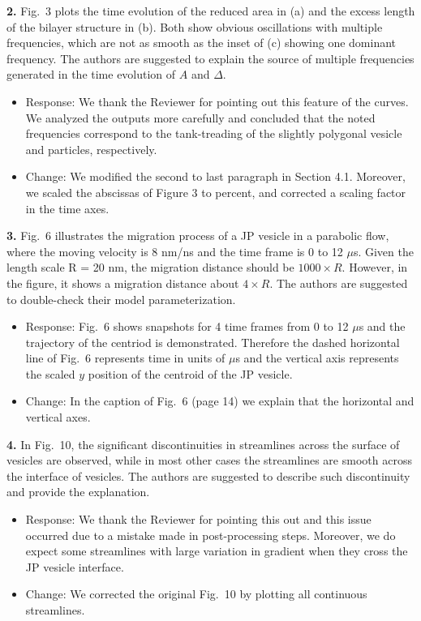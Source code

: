 \documentclass[11pt]{article}
\newcommand{\comment}[1]{{\color{blue} #1}}
\begin{document}
\noindent
\comment{{\bf 2.} Fig.~3 plots the time evolution of the reduced area in (a) and
the excess length of the bilayer structure in (b). Both show obvious
oscillations with multiple frequencies, which are not as smooth as the
inset of (c) showing one dominant frequency. The authors are suggested
to explain the source of multiple frequencies generated in the time
evolution of $A$ and $\Delta$.}
\begin{itemize}
\item Response: We thank the Reviewer for pointing out this feature of
  the curves.  We analyzed the outputs more carefully and concluded that
  the noted frequencies correspond to the tank-treading of the slightly
  polygonal vesicle and particles, respectively. 

\item Change: We modified the second to last paragraph in Section 4.1.
  Moreover, we scaled the abscissas of Figure 3 to percent, and corrected
  a scaling factor in the time axes. 

\end{itemize}

\noindent
\comment{{\bf 3.} Fig.~6 illustrates the migration process of a JP vesicle in a
parabolic flow, where the moving velocity is 8 nm/ns and the time frame
is 0 to 12 $\mu$s. Given the length scale R = 20 nm, the migration
distance should be $1000 \times R$. However, in the figure, it shows a
migration distance about $4 \times R$. The authors are suggested to
double-check their model parameterization.}
\begin{itemize}
  \item Response: Fig.~6 shows snapshots for 4 time frames from 0 to 12 $\mu$s and the trajectory of the centriod is demonstrated. Therefore the dashed horizontal line of Fig.~6 represents time in units of $\mu$s and the vertical axis represents the scaled $y$ position of the centroid of the JP vesicle.
  \item Change: In the caption of Fig.~6 (page 14) we explain that the horizontal and vertical axes.
  
\end{itemize}

\noindent
\comment{{\bf 4.} In Fig.~10, the significant discontinuities in streamlines
across the surface of vesicles are observed, while in most other cases
the streamlines are smooth across the interface of vesicles. The authors
are suggested to describe such discontinuity and provide the
explanation.}
\begin{itemize}
  \item Response: We thank the Reviewer for pointing this out and this issue occurred due to a mistake made in post-processing
steps. Moreover, we do expect some  streamlines with large variation in gradient when they cross the JP vesicle interface.

\item Change: We corrected the original Fig.~10 by plotting all continuous streamlines. 
\end{itemize}
\end{document}
